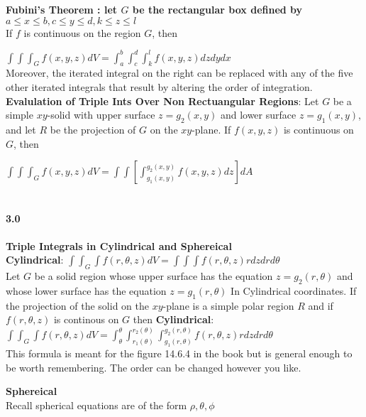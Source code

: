 \documentclass[14pt]{extreport}
\begin{document}
\textbf{Fubini's Theorem : let $G$ be the rectangular box defined by}\\

$a \le x \le b, c \le y \le d, k \le z \le l$\\

If $f$ is continuous on the region $G$, then

$\int\int\int_G f(x, y, z)dV = \int_a^b\int_c^d\int_k^l f(x, y, z)dzdydx$\\

Moreover, the iterated integral on the right can be replaced with any of the five other
iterated integrals that result by altering the order of integration.\\

\textbf{Evalulation of Triple Ints Over Non Rectuangular Regions}: Let $G$ be a simple $xy$-solid with upper surface $z=g_2(x, y)$ and lower surface
$z = g_1(x ,y)$, and let $R$ be the projection of $G$ on the $xy$-plane. If $f(x, y, z)$ is continuous on $G$, then

$\int\int\int_G f(x, y, z)dV = \int\int[\int_{g_1(x,y)}^{g_2(x,y)} f(x, y, z)dz] dA$\\\\


\paragraph{3.0} \textbf{Triple Integrals in Cylindrical and Sphereical}\\

\textbf{Cylindrical}: $\int\int_G\int f(r, \theta, z)dV = \int\int\int f(r, \theta, z)rdzdrd\theta$\\

Let $G$ be a solid region whose upper surface has the equation $z = g_2(r, \theta)$ and whose lower surface has the equation $z = g_1(r, \theta)$ In
Cylindrical coordinates. If the projection of the solid on the $xy$-plane is a simple polar region $R$ and if 
$f(r, \theta, z)$ is continous on $G$ then
\textbf{Cylindrical}: $\int\int_G\int f(r, \theta, z)dV = \int_{\theta}^{\theta}\int_{r_1(\theta)}^{r_2(\theta)}\int_{g_1(r, \theta)}^{g_2(r, \theta)} f(r, \theta, z)rdzdrd\theta$\\
This formula is meant for the figure 14.6.4 in the book but is general enough to be worth remembering.
The order can be changed however you like.


\textbf{Sphereical}\\

Recall spherical equations are of the form $\rho, \theta, \phi$ 
\end{document}
